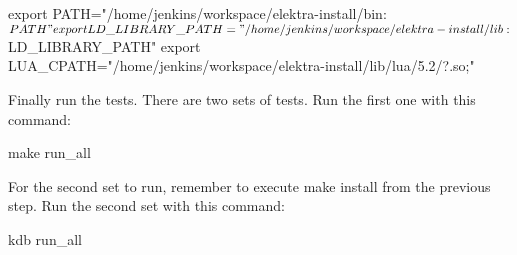\begin{DoxyCode}
export PATH="/home/jenkins/workspace/elektra-install/bin:$PATH"
export LD\_LIBRARY\_PATH="/home/jenkins/workspace/elektra-install/lib:$LD\_LIBRARY\_PATH"
export LUA\_CPATH="/home/jenkins/workspace/elektra-install/lib/lua/5.2/?.so;"
\end{DoxyCode}


Finally run the tests. There are two sets of tests. Run the first one with this command\+:


\begin{DoxyCode}
make run\_all
\end{DoxyCode}


For the second set to run, remember to execute {\ttfamily make install} from the previous step. Run the second set with this command\+:


\begin{DoxyCode}
kdb run\_all
\end{DoxyCode}
 
